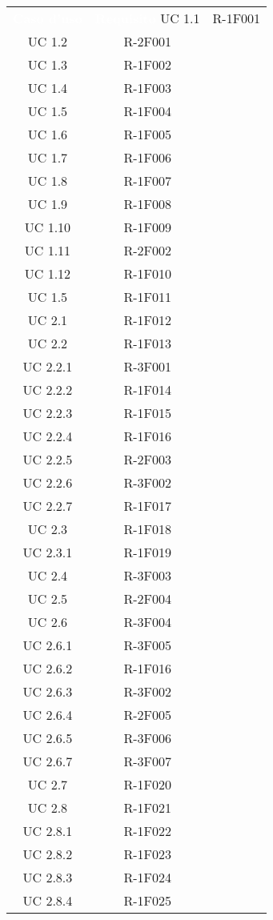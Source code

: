 \begin{tabularx}{\textwidth}{c|c}
	\rowcolor{greySWEight}
	\textcolor{white}{\textbf{Caso d'uso}} &
	\textcolor{white}{\textbf{Requisito}}\endhead
		UC 1.1 & R-1F001 \\
		UC 1.2 & R-2F001 \\
		UC 1.3 & R-1F002 \\
		UC 1.4 & R-1F003 \\
		UC 1.5 & R-1F004 \\
		UC 1.6 & R-1F005 \\
		UC 1.7 & R-1F006 \\
		UC 1.8 & R-1F007 \\
		UC 1.9 & R-1F008 \\
		UC 1.10 & R-1F009 \\
		UC 1.11 & R-2F002 \\
		UC 1.12 & R-1F010 \\
		UC 1.5 & R-1F011 \\
		UC 2.1 & R-1F012 \\
		UC 2.2 & R-1F013 \\
		UC 2.2.1 & R-3F001 \\
		UC 2.2.2 & R-1F014 \\
		UC 2.2.3 & R-1F015 \\
		UC 2.2.4 & R-1F016 \\
		UC 2.2.5 & R-2F003 \\
		UC 2.2.6 & R-3F002 \\
		UC 2.2.7 & R-1F017 \\
		UC 2.3 & R-1F018 \\
		UC 2.3.1 & R-1F019 \\
		UC 2.4 & R-3F003 \\
		UC 2.5 & R-2F004 \\
		UC 2.6 & R-3F004 \\
		UC 2.6.1 & R-3F005 \\
		UC 2.6.2 & R-1F016 \\
		UC 2.6.3 & R-3F002 \\
		UC 2.6.4 & R-2F005 \\
		UC 2.6.5 & R-3F006 \\
		UC 2.6.7 & R-3F007 \\
		UC 2.7 & R-1F020 \\
		UC 2.8 & R-1F021 \\
		UC 2.8.1 & R-1F022 \\
		UC 2.8.2 & R-1F023 \\
		UC 2.8.3 & R-1F024 \\
		UC 2.8.4 & R-1F025 \\

\end{tabularx}
